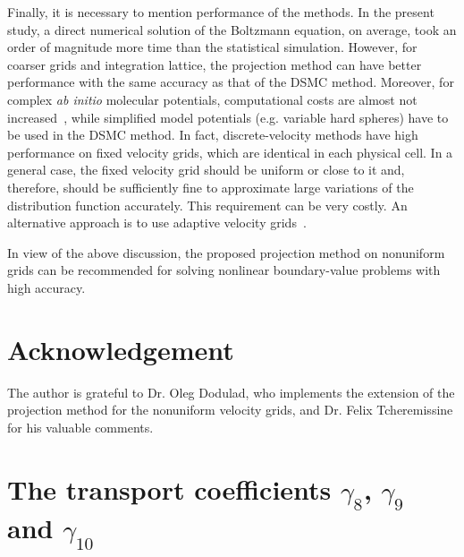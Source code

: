 \documentclass[review]{elsarticle}
\begin{document}
Finally, it is necessary to mention performance of the methods.
In the present study, a direct numerical solution of the Boltzmann equation, on average,
took an order of magnitude more time than the statistical simulation.
However, for coarser grids and integration lattice, the projection method can
have better performance with the same accuracy as that of the DSMC method.
Moreover, for complex \textit{ab initio} molecular potentials, computational costs are almost not increased~\citep{Dodulad2014},
while simplified model potentials (e.g. variable hard spheres) have to be used in the DSMC method.
In fact, discrete-velocity methods have high performance on fixed velocity grids,
which are identical in each physical cell.
In a general case, the fixed velocity grid should be uniform or close to it and, therefore,
should be sufficiently fine to approximate large variations of the distribution function accurately.
This requirement can be very costly. An alternative approach is to use adaptive velocity grids~\citep{Kolobov2013}.

In view of the above discussion, the proposed projection method on nonuniform grids can be recommended
for solving nonlinear boundary-value problems with high accuracy.

\section*{Acknowledgement}

The author is grateful to Dr. Oleg Dodulad, who implements the extension
of the projection method for the nonuniform velocity grids,
and Dr. Felix Tcheremissine for his valuable comments.

\appendix
\section{The transport coefficients \(\gamma_8\), \(\gamma_9\) and \(\gamma_{10}\)}
\label{sec:gamma_coeffs}
\end{document}
